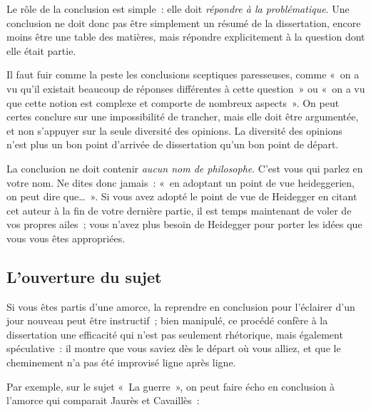 \documentclass[a4paper,12pt]{article}
\begin{document}
Le rôle de la conclusion est simple : elle doit \emph{répondre à la
problématique}. Une conclusion ne doit donc pas être simplement un
résumé de la dissertation, encore moins être une table des matières,
mais répondre explicitement à la question dont elle était partie.

Il faut fuir comme la peste les conclusions sceptiques paresseuses,
comme « on a vu qu'il existait beaucoup de réponses différentes à cette
question » ou « on a vu que cette notion est complexe et comporte de
nombreux aspects ». On peut certes conclure sur une impossibilité de
trancher, mais elle doit être argumentée, et non s'appuyer sur la seule
diversité des opinions. La diversité des opinions n'est plus un bon
point d'arrivée de dissertation qu'un bon point de départ.

La conclusion ne doit contenir \emph{aucun nom de philosophe}. C'est vous qui
parlez en votre nom. Ne dites donc jamais : « en adoptant un point de vue
heideggerien, on peut dire que\ldots{} ». Si vous avez adopté le point de vue
de Heidegger en citant cet auteur à la fin de votre dernière partie, il
est temps maintenant de voler de vos propres ailes ; vous n'avez plus
besoin de Heidegger pour porter les idées que vous vous êtes
appropriées.

\subsection{L'ouverture du sujet}
\label{sec-4-2}

Si vous êtes partis d'une amorce, la reprendre en conclusion pour
l'éclairer d'un jour nouveau peut être instructif ; bien manipulé, ce
procédé confère à la dissertation une efficacité qui n'est pas seulement
rhétorique, mais également spéculative : il montre que vous saviez dès
le départ où vous alliez, et que le cheminement n'a pas été improvisé
ligne après ligne.

Par exemple, sur le sujet « La guerre », on peut faire écho en conclusion
à l'amorce qui comparait Jaurès et Cavaillès :
\end{document}
